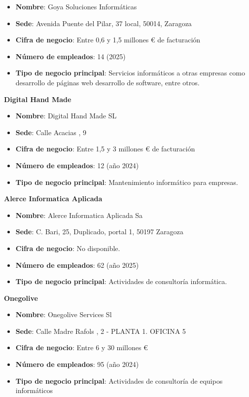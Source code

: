\documentclass[11.5pt]{article}
\begin{document}
	\begin{itemize}
		\item \textbf{Nombre}: Goya Soluciones Informáticas	
		\item 	\textbf{Sede}: Avenida Puente del Pilar, 37 local, 50014, Zaragoza
		\item 	\textbf{Cifra de negocio}: Entre 0,6 y 1,5 millones € de facturación
		\item 	\textbf{Número de empleados}: 14 (2025)
		\item 	\textbf{Tipo de negocio principal}: Servicios informáticos a otras empresas como desarrollo de páginas web desarrollo de software, entre otros.
	\end{itemize}
	
	\noindent\textbf{{\large Digital Hand Made}}
	
	\begin{itemize}
		\item \textbf{Nombre}: Digital Hand Made SL
		\item 	\textbf{Sede}: Calle Acacias , 9
		\item 	\textbf{Cifra de negocio}: Entre 1,5 y 3 millones € de facturación
		\item 	\textbf{Número de empleados}: 12 (año 2024)	
		\item 	\textbf{Tipo de negocio principal}: Mantenimiento informático para empresas.
	\end{itemize}
	
	\noindent\textbf{{\large Alerce Informatica Aplicada}}
	
	\begin{itemize}
		\item \textbf{Nombre}: Alerce Informatica Aplicada Sa
		\item 	\textbf{Sede}: C. Bari, 25, Duplicado, portal 1, 50197 Zaragoza
		\item 	\textbf{Cifra de negocio}: No disponible.
		\item 	\textbf{Número de empleados}: 62 (año 2025)
		\item 	\textbf{Tipo de negocio principal}: Actividades de consultoría informática.
	\end{itemize}
	
	\noindent\textbf{{\large Onegolive}}
	
	\begin{itemize}
		\item \textbf{Nombre}: Onegolive Services Sl
		\item 	\textbf{Sede}: Calle Madre Rafols , 2 - PLANTA 1. OFICINA 5
		\item 	\textbf{Cifra de negocio}: Entre 6 y 30 millones €
		\item 	\textbf{Número de empleados}: 95 (año 2024)
		\item 	\textbf{Tipo de negocio principal}: Actividades de consultoría de equipos informáticos
	\end{itemize}
	
\end{document}
